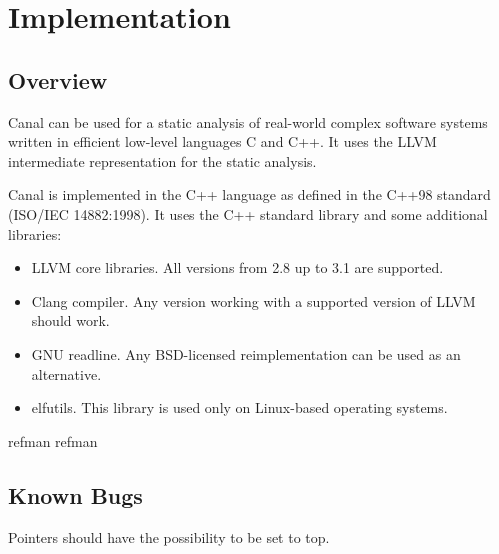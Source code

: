 \documentclass[a4paper]{book}
\begin{document}
\part{Implementation}

\chapter{Overview}

Canal can be used for a static analysis of real-world complex software
systems written in efficient low-level languages C and C++.  It uses
the LLVM intermediate representation for the static analysis.

Canal is implemented in the C++ language as defined in the C++98
standard (ISO/IEC 14882:1998).  It uses the C++ standard library and
some additional libraries:
\begin{itemize}
\item LLVM core libraries.  All versions from 2.8 up to 3.1 are
  supported.
\item Clang compiler.  Any version working with a supported version of
  LLVM should work.
\item GNU readline.  Any BSD-licensed reimplementation can be used as
  an alternative.
\item elfutils.  This library is used only on Linux-based operating
  systems.
\end{itemize}

{refman}
{refman}

\chapter{Known Bugs}
Pointers should have the possibility to be set to top.
\end{document}
